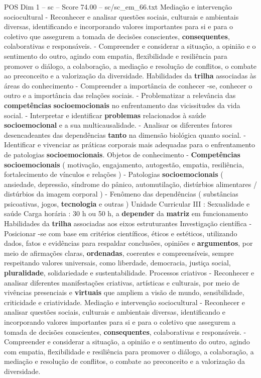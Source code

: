 \begin{textsample}{POS Dim 1 – sc – Score 74.00 – sc/sc\_em\_66.txt}
Mediação e intervenção sociocultural - Reconhecer e analisar questões sociais, culturais e ambientais diversas, identificando e incorporando valores importantes para si e para o coletivo que assegurem a tomada de decisões conscientes, \textbf{consequentes}, colaborativas e responsáveis. - Compreender e considerar a situação, a opinião e o sentimento do outro, agindo com empatia, flexibilidade e resiliência para promover o diálogo, a colaboração, a mediação e resolução de conflitos, o combate ao preconceito e a valorização da diversidade.
Habilidades da \textbf{trilha} associadas às áreas do conhecimento - Compreender a importância de conhecer -se, conhecer o outro e a importância das relações sociais. - Problematizar a relevância das \textbf{competências} \textbf{socioemocionais} no enfrentamento das vicissitudes da vida social. - Interpretar e identificar \textbf{problemas} relacionados à saúde \textbf{socioemocional} e a sua multicausalidade. - Analisar os diferentes fatores desencadeantes das dependências \textbf{tanto} na dimensão biológica quanto social. - Identificar e vivenciar as práticas corporais mais adequadas para o enfrentamento de patologias \textbf{socioemocionais}.
Objetos de conhecimento - \textbf{Competências} \textbf{socioemocionais} ( motivação, engajamento, autogestão, empatia, resiliência, fortalecimento de vínculos e relações ) - Patologias \textbf{socioemocionais} ( ansiedade, depressão, síndrome do pânico, automutilação, distúrbios alimentares / distúrbios da imagem corporal ) - Fenômeno das dependências ( substâncias psicoativas, jogos, \textbf{tecnologia} e outras ) Unidade Curricular III : Sexualidade e saúde Carga horária : 30 h ou 50 h, a \textbf{depender} da \textbf{matriz} em funcionamento Habilidades da \textbf{trilha} associadas aos eixos estruturantes Investigação científica - Posicionar -se com base em critérios científicos, éticos e estéticos, utilizando dados, fatos e evidências para respaldar conclusões, opiniões e \textbf{argumentos}, por meio de afirmações claras, \textbf{ordenadas}, coerentes e compreensíveis, sempre respeitando valores universais, como liberdade, democracia, justiça social, \textbf{pluralidade}, solidariedade e sustentabilidade.
Processos criativos - Reconhecer e analisar diferentes manifestações criativas, artísticas e culturais, por meio de vivências presenciais e \textbf{virtuais} que ampliem a visão de mundo, sensibilidade, criticidade e criatividade.
Mediação e intervenção sociocultural - Reconhecer e analisar questões sociais, culturais e ambientais diversas, identificando e incorporando valores importantes para si e para o coletivo que assegurem a tomada de decisões conscientes, \textbf{consequentes}, colaborativas e responsáveis. - Compreender e considerar a situação, a opinião e o sentimento do outro, agindo com empatia, flexibilidade e resiliência para promover o diálogo, a colaboração, a mediação e resolução de conflitos, o combate ao preconceito e a valorização da diversidade.

\end{textsample}
